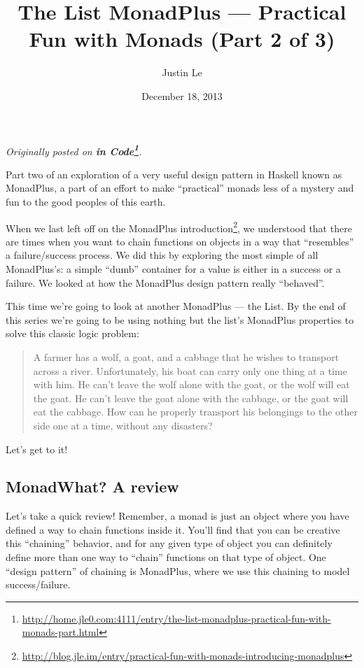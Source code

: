 \documentclass[]{article}
\title{The List MonadPlus --- Practical Fun with Monads (Part 2 of 3)}
\author{Justin Le}
\date{December 18, 2013}
\renewcommand{\href}[2]{#2\footnote{\url{#1}}}
\begin{document}
\maketitle

\emph{Originally posted on
\textbf{\href{http://home.jle0.com:4111/entry/the-list-monadplus-practical-fun-with-monads-part.html}{in
Code}}.}

Part two of an exploration of a very useful design pattern in Haskell known as MonadPlus, a part of
an effort to make ``practical'' monads less of a mystery and fun to the good peoples of this earth.

When we last left off on the
\href{http://blog.jle.im/entry/practical-fun-with-monads-introducing-monadplus}{MonadPlus
introduction}, we understood that there are times when you want to chain functions on objects in a
way that ``resembles'' a failure/success process. We did this by exploring the most simple of all
MonadPlus's: a simple ``dumb'' container for a value is either in a success or a failure. We looked
at how the MonadPlus design pattern really ``behaved''.

This time we're going to look at another MonadPlus --- the List. By the end of this series we're
going to be using nothing but the list's MonadPlus properties to solve this classic logic problem:

\begin{quote}
A farmer has a wolf, a goat, and a cabbage that he wishes to transport across a river.
Unfortunately, his boat can carry only one thing at a time with him. He can't leave the wolf alone
with the goat, or the wolf will eat the goat. He can't leave the goat alone with the cabbage, or the
goat will eat the cabbage. How can he properly transport his belongings to the other side one at a
time, without any disasters?
\end{quote}

Let's get to it!

\subsection{MonadWhat? A review}\label{monadwhat-a-review}

Let's take a quick review! Remember, a monad is just an object where you have defined a way to chain
functions inside it. You'll find that you can be creative this ``chaining'' behavior, and for any
given type of object you can definitely define more than one way to ``chain'' functions on that type
of object. One ``design pattern'' of chaining is MonadPlus, where we use this chaining to model
success/failure.
\end{document}
